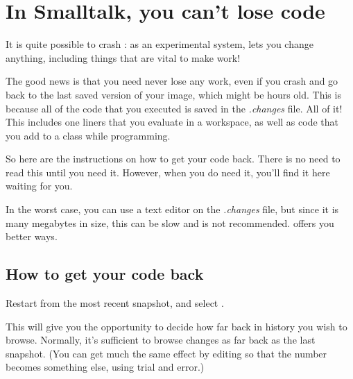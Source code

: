 \documentclass[a4paper,10pt,twoside]{book}
\begin{document}
\section{In Smalltalk, you can't lose code}

It is quite possible to crash \pharo: as an experimental system, \pharo lets you change anything, including things that are vital to make \pharo work! 


The good news is that you need never lose any work, even if you crash and go back to the last saved version of your image, which might be hours old.
This is because all of the code that you executed is saved in the \emph{.changes} file.
All of it!
This includes one liners that you evaluate in a workspace, as well as code that you add to a class while programming.

So here are the instructions on how to get your code back.
There is no need to read this until you need it. 
However, when you do need it, you'll find it here waiting for you.

In the worst case, you can use a text editor on the \emph{.changes} file, but since it is many megabytes in size, this can be slow and is not recommended. 
\pharo offers you better ways.

\subsection{How to get your code back}
Restart \pharo from the most recent snapshot, and select . 




This will give you the opportunity to decide how far back in history you wish to browse. 
Normally, it's sufficient to browse changes as far back as the last snapshot. (You can get much the same effect by editing  so that the number  becomes something else, using trial and error.)
\end{document}
